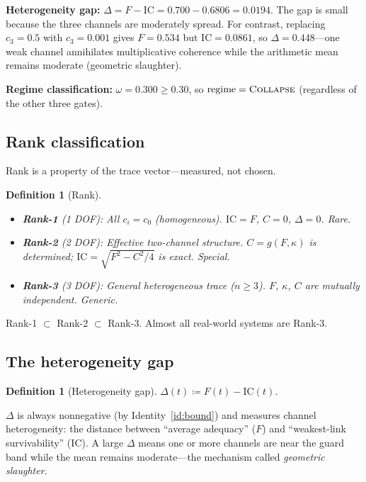 \documentclass[
  aps,
  prd,
  twocolumn,
  superscriptaddress,
  nofootinbib,
  floatfix
]{revtex4-2}
\newtheorem{definition}[theorem]{Definition}
\newcommand{\regime}[1]{\textrm{\scshape#1}}
\newcommand{\IC}{\mathrm{IC}}
\begin{document}
\noindent\textbf{Heterogeneity gap:}
$\Delta = F - \IC = 0.700 - 0.6806 = 0.0194$.  The gap is
small because the three channels are moderately spread.  For
contrast, replacing $c_3 = 0.5$ with $c_3 = 0.001$
gives $F = 0.534$ but $\IC = 0.0861$, so
$\Delta = 0.448$---one weak channel annihilates
multiplicative coherence while the arithmetic mean remains
moderate (geometric slaughter).

\noindent\textbf{Regime classification:}
$\omega = 0.300 \geq 0.30$, so
$\mathrm{regime} = \regime{Collapse}$
(regardless of the other three gates).

\subsection{Rank classification}

Rank is a property of the trace vector---measured, not
chosen.

\begin{definition}[Rank]
\label{def:rank}
\begin{itemize}[leftmargin=*]
\item \textbf{Rank-1} (1 DOF): All $c_i = c_0$ (homogeneous).
  $\IC = F$, $C = 0$, $\Delta = 0$.  Rare.
\item \textbf{Rank-2} (2 DOF): Effective two-channel structure.
  $C = g(F, \kappa)$ is determined; $\IC = \sqrt{F^2 - C^2/4}$
  is exact.  Special.
\item \textbf{Rank-3} (3 DOF): General heterogeneous trace
  ($n \geq 3$). $F$, $\kappa$, $C$ are mutually independent.
  Generic.
\end{itemize}
\end{definition}

\noindent Rank-1 $\subset$ Rank-2 $\subset$ Rank-3.  Almost all
real-world systems are Rank-3.

\subsection{The heterogeneity gap}

\begin{definition}[Heterogeneity gap]
$\Delta(t) \coloneqq F(t) - \IC(t)$.
\end{definition}

$\Delta$ is always nonnegative (by Identity~\ref{id:bound}) and
measures channel heterogeneity: the distance between ``average
adequacy'' ($F$) and ``weakest-link survivability'' ($\IC$).
A large $\Delta$ means one or more channels are near the guard
band while the mean remains moderate---the mechanism called
\emph{geometric slaughter}.
\end{document}
